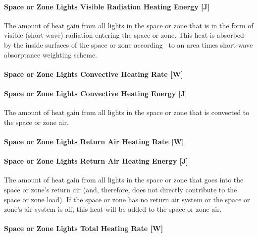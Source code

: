 \paragraph{Space or Zone Lights Visible Radiation Heating Energy {[}J{]}}\label{zone-lights-visible-radiation-heating-energy-j}

The amount of heat gain from all lights in the space or zone that is in the form of visible (short-wave) radiation entering the space or zone. This heat is absorbed by the inside surfaces of the space or zone according~ to an area times short-wave absorptance weighting scheme.

\paragraph{Space or Zone Lights Convective Heating Rate {[}W{]}}\label{zone-lights-convective-heating-rate-w}

\paragraph{Space or Zone Lights Convective Heating Energy {[}J{]}}\label{zone-lights-convective-heating-energy-j}

The amount of heat gain from all lights in the space or zone that is convected to the space or zone air.

\paragraph{Space or Zone Lights Return Air Heating Rate {[}W{]}}\label{zone-lights-return-air-heating-rate-w}

\paragraph{Space or Zone Lights Return Air Heating Energy {[}J{]}}\label{zone-lights-return-air-heating-energy-j}

The amount of heat gain from all lights in the space or zone that goes into the space or zone's return air (and, therefore, does not directly contribute to the space or zone load). If the space or zone has no return air system or the space or zone's air system is off, this heat will be added to the space or zone air.

\paragraph{Space or Zone Lights Total Heating Rate {[}W{]}}\label{zone-lights-total-heating-rate-w}

